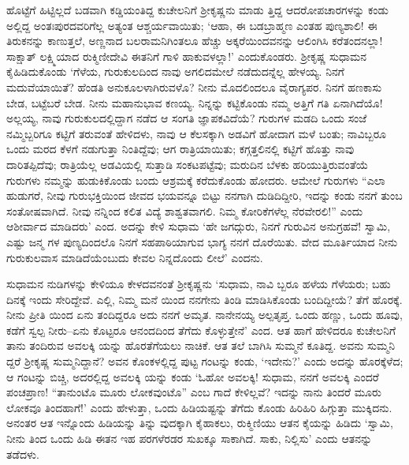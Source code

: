 ಹೊಟ್ಟೆಗೆ ಹಿಟ್ಟಿಲ್ಲದೆ ಬಡವಾಗಿ ಕಡ್ಡಿಯಂತಿದ್ದ ಕುಚೇಲನಿಗೆ ಶ್ರೀಕೃಷ್ಣನು ಮಾಡು ತ್ತಿದ್ದ ಆದರೋಪಚಾರಗಳನ್ನು ಕಂಡು ಅಲ್ಲಿದ್ದ ಅಂತಃಪುರದವರಿಗೆಲ್ಲ ಅತ್ಯಂತ ಆಶ್ಚರ್ಯವಾಯಿತು; ‘ಆಹಾ, ಈ ಬಡಬ್ರಾಹ್ಮಣ ಎಂತಹ ಪುಣ್ಯಶಾಲಿ! ಈ ತಿರುಕನನ್ನು ಕಾಣುತ್ತಲೆ, ಅಣ್ಣನಾದ ಬಲರಾಮನಿಗಿಂತಲೂ ಹೆಚ್ಚು ಅಕ್ಕರೆಯಿಂದವನನ್ನು ಆಲಿಂಗಿಸಿ ಕರೆತಂದನಲ್ಲಾ! ಸಾಕ್ಷಾತ್ ಲಕ್ಷ್ಮಿಯಾದ ರುಕ್ಮಿಣೀದೇವಿ ಈತನಿಗೆ ಗಾಳಿ ಹಾಕುವಳಲ್ಲಾ!’ ಎಂದುಕೊಂಡರು. ಶ್ರೀಕೃಷ್ಣ ಸುಧಾಮನ ಕೈಹಿಡಿದುಕೊಂಡು ‘ಗೆಳೆಯ, ಗುರುಕುಲದಿಂದ ನಾವು ಅಗಲಿದಮೇಲೆ ನಡೆದುದನ್ನೆಲ್ಲ ಹೇಳಯ್ಯ. ನಿನಗೆ ಮದುವೆಯಾಯಿತೆ? ಹೆಂಡತಿ ಅನುಕೂಲಳಾಗಿರುವಳೊ? ನೀನು ಮೊದಲಿಂದಲೂ ವೈರಾಗ್ಯಪರ. ನಿನಗೆ ಹಣಕಾಸು ಬೇಡ, ಬಟ್ಟೆಬರೆ ಬೇಡ. ನೀನು ಮಹಾನುಭಾವ ಕಣಯ್ಯ. ನಿನ್ನನ್ನು ಕಟ್ಟಿಕೊಂಡು ನಮ್ಮ ಅತ್ತಿಗೆ ಗತಿ ಏನಾಗಿದೆಯೊ! ಅಲ್ಲಯ್ಯ, ನಾವು ಗುರುಕುಲದಲ್ಲಿದ್ದಾಗ ನಡೆದ ಆ ಸಂಗತಿ ಜ್ಞಾಪಕವಿದೆಯೆ? ಗುರುಗಳ ಮಡದಿ ಒಂದು ಸಂಜೆ ನಮ್ಮಿಬ್ಬರಿಗೂ ಕಟ್ಟಿಗೆ ತರುವಂತೆ ಹೇಳಿದಳು, ನಾವು ಆ ಕೆಲಸಕ್ಕಾಗಿ ಅಡವಿಗೆ ಹೋದಾಗ ಮಳೆ ಬಂತು; ನಾವಿಬ್ಬರೂ ಒಂದು ಮರದ ಕೆಳಗೆ ನಡುಗುತ್ತಾ ನಿಂತಿದ್ದೆವು; ಆಗ ರಾತ್ರಿಯಾಯಿತು; ಕಗ್ಗತ್ತಲಿನಲ್ಲಿ ಕಟ್ಟಿಗೆ ಹೊತ್ತು ನಾವು ದಾರಿತಪ್ಪಿದೆವು; ರಾತ್ರಿಯೆಲ್ಲ ಅಡವಿಯಲ್ಲಿ ಸುತ್ತಾಡಿ ಸಂಕಟಪಟ್ಟೆವು; ಮರುದಿನ ಬೆಳಕು ಹರಿಯುತ್ತಿರುವಂತೆಯೆ ಗುರುಗಳು ನಮ್ಮನ್ನು ಹುಡುಕಿಕೊಂಡು ಬಂದು ಆಶ್ರಮಕ್ಕೆ ಕರೆದುಕೊಂಡು ಹೋದರು. ಆಮೇಲೆ ಗುರುಗಳು “ಎಲಾ ಹುಡುಗರೆ, ನೀವು ಗುರುಭಕ್ತಿಯಿಂದ ಜೀವದ ಭಯವನ್ನೂ ಬಿಟ್ಟು ನನಗಾಗಿ ದುಡಿದಿದ್ದೀರಿ, ಇದನ್ನು ಕಂಡು ನನಗೆ ತುಂಬ ಸಂತೋಷವಾಗಿದೆ. ನೀವು ನನ್ನಿಂದ ಕಲಿತ ವಿದ್ಯೆ ಶಾಶ್ವತವಾಗಲಿ. ನಿಮ್ಮ ಕೋರಿಕೆಗಳೆಲ್ಲ ನೆರವೇರಲಿ!” ಎಂದು ಆಶೀರ್ವಾದ ಮಾಡಿದರು’ ಎಂದ. ಅದನ್ನು ಕೇಳಿ ಸುಧಾಮ ‘ಹೇ ಜಗದ್ಗುರು, ನಿನಗೆ ಗುರುವಿನ ಅನುಗ್ರಹವೆ! ಸ್ವಾಮಿ, ಎಷ್ಟು ಜನ್ಮ ಗಳ ಪುಣ್ಯದಿಂದಲೊ ನಿನಗೆ ಸಹಪಾಠಿಯಾಗುವ ಭಾಗ್ಯ ನನಗೆ ದೊರೆಯಿತು. ವೇದ ಮೂರ್ತಿಯಾದ ನೀನು ಗುರುಕುಲವಾಸ ಮಾಡಿದೆಯೆಂಬುದು ಕೇವಲ ನಿನ್ನದೊಂದು ಲೀಲೆ’ ಎಂದನು.

ಸುಧಾಮನ ನುಡಿಗಳನ್ನು ಕೇಳಿಯೂ ಕೇಳದವನಂತೆ ಶ್ರೀಕೃಷ್ಣನು ‘ಸುಧಾಮ, ನಾವಿ ಬ್ಬರೂ ಹಳೆಯ ಗೆಳೆಯರು; ಬಹು ದಿನಕ್ಕೆ ಇಂದು ಸೇರಿದ್ದೇವೆ. ಎಲ್ಲಿ, ನಿಮ್ಮ ಮನೆ ಯಿಂದ ನನಗೇನು ತಿಂಡಿ ಮಾಡಿಸಿಕೊಂಡು ಬಂದಿದ್ದೀಯೆ? ತೆಗೆ ಹೊರಕ್ಕೆ. ನೀನು ಪ್ರೀತಿ ಯಿಂದ ಏನು ತಂದಿದ್ದರೂ ಅದು ನನಗೆ ಅಮೃತ. ನಾನೇನಯ್ಯ ಅಲ್ಪತೃಪ್ತ. ಒಂದು ಹಣ್ಣು, ಒಂದು ಹೂವು, ಕಡೆಗೆ ಸ್ವಲ್ಪ ನೀರು–ಏನು ಕೊಟ್ಟರೂ ಆನಂದದಿಂದ ತೆಗೆದು ಕೊಳ್ಳುತ್ತೇನೆ’ ಎಂದ. ಆತ ಹಾಗೆ ಹೇಳಿದರೂ ಕುಚೇಲನಿಗೆ ತಾನು ತಂದಿರುವ ಅವಲಕ್ಕಿ ಯನ್ನು ಹೊರತೆಗೆಯಲು ನಾಚಿಕೆ. ಆತ ತಲೆ ಬಾಗಿಸಿ ಸುಮ್ಮನೆ ಕೂತಿದ್ದ. ಅವನು ಸುಮ್ಮನಿ ದ್ದರೆ ಶ್ರೀಕೃಷ್ಣ ಸುಮ್ಮನಿದ್ದಾನೆ? ಅವನ ಕೊಂಕಳಲ್ಲಿದ್ದ ಪುಟ್ಟ ಗಂಟನ್ನು ಕಂಡು, ‘ಇದೇನು?’ ಎಂದು ಅದನ್ನು ಹೊರಕ್ಕೆಳೆದ; ಆ ಗಂಟನ್ನು ಬಿಚ್ಚಿ, ಅದರಲ್ಲಿದ್ದ ಅವಲಕ್ಕಿ ಯನ್ನು ಕಂಡು ‘ಓಹೋ ಅವಲಕ್ಕಿ! ಸುಧಾಮ, ನನಗೆ ಅವಲಕ್ಕಿ ಎಂದರೆ ಪಂಚಪ್ರಾಣ! “ತಾನುಂಟೊ ಮೂರು ಲೋಕವುಂಟೊ” ಎಂಬ ಗಾದೆ ಕೇಳಿಲ್ಲವೆ? ಇದನ್ನು ನಾನು ತಿಂದರೆ ಮೂರು ಲೋಕವೂ ತಿಂದಹಾಗೆ!’ ಎಂದು ಹೇಳುತ್ತಾ, ಒಂದು ಹಿಡಿಯಷ್ಟನ್ನು ತೆಗೆದು ಕೊಂಡು ಹಿರಿಹಿರಿ ಹಿಗ್ಗುತ್ತಾ ಮುಕ್ಕಿದನು. ಅನಂತರ ಆತ ಇನ್ನೊಂದು ಹಿಡಿಯನ್ನು ತಿನ್ನು ವುದಕ್ಕಾಗಿ ಕೈಹಾಕಲು, ರುಕ್ಮಿಣಿಯು ಆತನ ಕೈಯನ್ನು ಹಿಡಿದು ‘ಸ್ವಾಮಿ, ನೀನು ತಿಂದ ಒಂದು ಹಿಡಿ ಈತನ ಇಹ ಪರಗಳೆರಡರ ಸುಖಕ್ಕೂ ಸಾಕಾಗಿದೆ. ಸಾಕು, ನಿಲ್ಲಿಸು’ ಎಂದು ಆತನನ್ನು ತಡೆದಳು.

